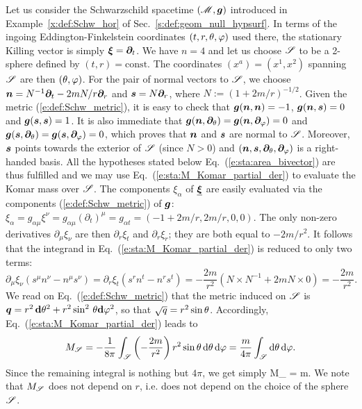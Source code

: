 \begin{example}
\label{x:sta:Komar_mass_Schw}
Let us consider the Schwarzschild spacetime $(\mathscr{M},\bm{g})$
introduced in
Example~\ref{x:def:Schw_hor} of Sec.~\ref{s:def:geom_null_hypsurf}.
In terms of the ingoing Eddington-Finkelstein coordinates $(t,r,\theta,\varphi)$ used there,
the stationary Killing vector is simply $\bm{\xi} = \bm{\partial}_t$.
We have $n=4$ and let us choose $\mathscr{S}$ to be a 2-sphere defined by $(t,r) = \mathrm{const}$.
The coordinates $(x^a) = (x^1, x^2)$ spanning $\mathscr{S}$ are then $(\theta,\varphi)$.
For the pair of normal vectors to $\mathscr{S}$, we choose
$\bm{n} = N^{-1} \bm{\partial}_t  - 2mN/r \bm{\partial}_r$ and $\bm{s} = N \bm{\partial}_r$, where
$N := (1 + 2m/r)^{-1/2}$. Given the metric (\ref{e:def:Schw_metric}), it is
easy to check that
$\bm{g}(\bm{n},\bm{n}) = -1$, $\bm{g}(\bm{n},\bm{s}) = 0$ and $\bm{g}(\bm{s},\bm{s}) = 1$.
It is also immediate that $\bm{g}(\bm{n},\bm{\partial}_\theta) = \bm{g}(\bm{n},\bm{\partial}_\varphi) =  0$ and
$\bm{g}(\bm{s},\bm{\partial}_\theta) = \bm{g}(\bm{s},\bm{\partial}_\varphi) =  0$,
which proves that $\bm{n}$ and $\bm{s}$ are normal to $\mathscr{S}$.
Moreover, $\bm{s}$ points towards the exterior of $\mathscr{S}$ (since $N>0$) and
$(\bm{n},\bm{s},\bm{\partial}_\theta,\bm{\partial}_\varphi)$ is a right-handed basis. All the hypotheses
stated below Eq.~(\ref{e:sta:area_bivector}) are thus fulfilled and we may use
Eq.~(\ref{e:sta:M_Komar_partial_der}) to evaluate the Komar mass over $\mathscr{S}$.
The components $\xi_\alpha$ of $\underline{\bm{\xi}}$ are easily evaluated via
the components (\ref{e:def:Schw_metric}) of $\bm{g}$:
$\xi_\alpha = g_{\alpha\mu} \xi^\nu = g_{\alpha\mu} (\partial_t)^\mu = g_{\alpha t}
= (-1 + 2m/r, 2m/r, 0, 0)$.
The only non-zero derivatives $\partial_\mu\xi_\nu$
are then $\partial_r \xi_t$ and $\partial_r \xi_r$; they are both equal to $-2m/r^2$.
It follows that the integrand in Eq.~(\ref{e:sta:M_Komar_partial_der}) is reduced to only two terms:
\[
  \partial_\mu \xi_\nu (s^\mu   n^\nu - n^\mu s^\nu) =
  \partial_r \xi_t (s^r n^t - n^r s^t) = - \frac{2m}{r^2}
  \left( N \times N^{-1}  + 2m N\times 0 \right) = - \frac{2m}{r^2} .
\]
We read on Eq.~(\ref{e:def:Schw_metric}) that the metric induced on
$\mathscr{S}$ is $\bm{q} = r^2 \, \mathbf{d}\theta^2 + r^2 \sin^2\, \theta \mathbf{d}\varphi^2$, so that $\sqrt{q} = r^2 \sin\theta$.
Accordingly, Eq.~(\ref{e:sta:M_Komar_partial_der}) leads to
\[
    M_{\mathscr{S}} = -\frac{1}{8\pi} \int_{\mathscr{S}} \left( - \frac{2m}{r^2} \right)
    r^2 \sin\theta \, \mathrm{d}\theta \, \mathrm{d}\varphi = \frac{m}{4\pi} \int_{\mathscr{S}} \mathrm{d}\theta \, \mathrm{d}\varphi .
\]
Since the remaining integral is nothing but $4\pi$, we get simply
\be
    M_{\Sp} = m.
\ee
We note that $M_{\mathscr{S}}$ does not depend on $r$, i.e. does not depend on the
choice of the sphere $\mathscr{S}$.
\end{example}

